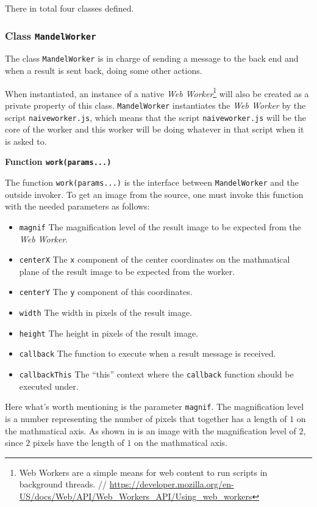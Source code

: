 There in total four classes defined.

\subsubsection{Class \texttt{MandelWorker}}

The class \texttt{MandelWorker} is in charge of sending a message to the back end and when a result is sent back, doing some other actions.

When instantiated, an instance of a native \emph{Web Worker}\footnote{ Web Workers are a simple means for web content to run scripts in background threads. // \url{https://developer.mozilla.org/en-US/docs/Web/API/Web_Workers_API/Using_web_workers}} will also be created as a private property of this class. \texttt{MandelWorker} instantiates the \emph{Web Worker} by the script \texttt{naive\-worker.js}, which means that the script \texttt{naive\-worker.js} will be the core of the worker and this worker will be doing whatever in that script when it is asked to.

\textbf{Function \texttt{work(params...)}}

The function \texttt{work(params...)} is the interface between \texttt{MandelWorker} and the outside invoker. To get an image from the source, one must invoke this function with the needed parameters as follows:

\begin{itemize}
  \item \texttt{magnif} The magnification level of the result image to be expected from the \emph{Web Worker}.
  \item \texttt{centerX} The \texttt{x} component of the center coordinates on the mathmatical plane of the result image to be expected from the worker.
  \item \texttt{centerY} The \texttt{y} component of this coordinates.
  \item \texttt{width} The width in pixels of the result image.
  \item \texttt{height} The height in pixels of the result image.
  \item \texttt{callback} The function to execute when a result message is received.
  \item \texttt{callbackThis} The ``this'' context where the \texttt{callback} function should be executed under.
\end{itemize}

Here what's worth mentioning is the parameter \texttt{magnif}. The magnification level is a number representing the number of pixels that together has a length of $1$ on the mathmatical axis. As shown in  is an image with the magnification level of $2$, since $2$ pixels have the length of $1$ on the mathmatical axis.

